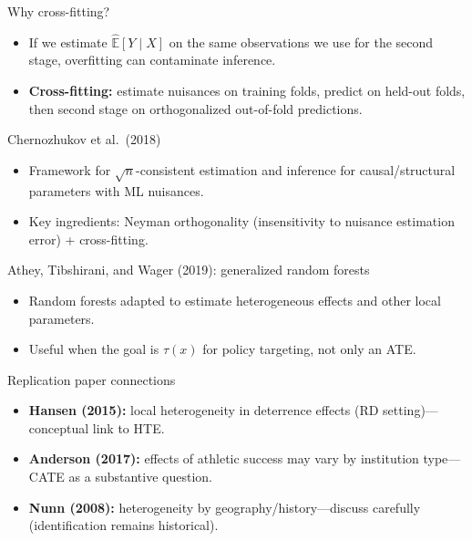 \documentclass[aspectratio=169,11pt]{beamer}
\begin{document}
\begin{frame}{Why cross-fitting?}
  \begin{itemize}
    \item If we estimate \(\widehat{\mathbb{E}}[Y\mid X]\) on the same observations we use for the second stage, overfitting can contaminate inference.
    \item \textbf{Cross-fitting:} estimate nuisances on training folds, predict on held-out folds, then second stage on orthogonalized out-of-fold predictions.
  \end{itemize}
\end{frame}

\begin{frame}{Chernozhukov et al.\ (2018)}
  \begin{itemize}
    \item Framework for \(\sqrt{n}\)-consistent estimation and inference for causal/structural parameters with ML nuisances.
    \item Key ingredients: Neyman orthogonality (insensitivity to nuisance estimation error) + cross-fitting.
  \end{itemize}
\end{frame}

\begin{frame}{Athey, Tibshirani, and Wager (2019): generalized random forests}
  \begin{itemize}
    \item Random forests adapted to estimate heterogeneous effects and other local parameters.
    \item Useful when the goal is \(\tau(x)\) for policy targeting, not only an ATE.
  \end{itemize}
\end{frame}

\begin{frame}{Replication paper connections}
  \begin{itemize}
    \item \textbf{Hansen (2015):} local heterogeneity in deterrence effects (RD setting)---conceptual link to HTE.
    \item \textbf{Anderson (2017):} effects of athletic success may vary by institution type---CATE as a substantive question.
    \item \textbf{Nunn (2008):} heterogeneity by geography/history---discuss carefully (identification remains historical).
  \end{itemize}
\end{frame}
\end{document}
